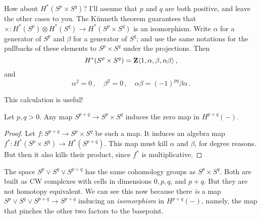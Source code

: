 \begin{example}
How about $H^\ast(S^p\times S^q)$? I'll assume that $p$ and $q$ are both
positive, and leave the other cases to you. The K\"unneth theorem guarantees
that $\times:H^*(S^p)\otimes H^*(S^q)\to H^*(S^p\times S^q)$ is an isomorphism.
Write $\alpha$ for a generator of $S^p$ and $\beta$ for a generator of 
$S^q$; and use the same notations for the pullbacks of these elements to
$S^p\times S^q$ under the projections. Then 
\[
H^*(S^p\times S^q)=\mathbf Z\langle1,\alpha,\beta,\alpha\beta\rangle\,,
\]
and
\[
\alpha^2=0\,,\quad\beta^2=0\,,\quad\alpha\beta=(-1)^{pq}\beta\alpha\,.
\]

This calculation is useful!
\begin{corollary} Let $p,q>0$.
Any map $S^{p+q}\to S^p\times S^q$ induces the zero map in $H^{p+q}(-)$. 
\end{corollary}
\begin{proof}
Let $f:S^{p+q}\to S^p\times S^q$ be such a map. It induces an algebra map
$f^*:H^*(S^p\times S^q)\to H^*(S^{p+q})$. This map must kill $\alpha$ and
$\beta$, for degree reasons. But then it also kills their product, since
$f^*$ is multiplicative. 
\end{proof}
The space $S^p\vee S^q\vee S^{p+q}$ has the same cohomology groups as
$S^p\times S^q$. Both are built as CW complexes with cells in dimensions
$0, p, q$, and $p+q$. But they are not homotopy equivalent. We can see this
now because there {\em is} a map $S^p\vee S^q\vee S^{p+q}\to S^{p+q}$
inducing an {\em isomorphism} in $H^{p+q}(-)$, namely, the map that pinches
the other two factors to the basepoint. 
\end{example}
